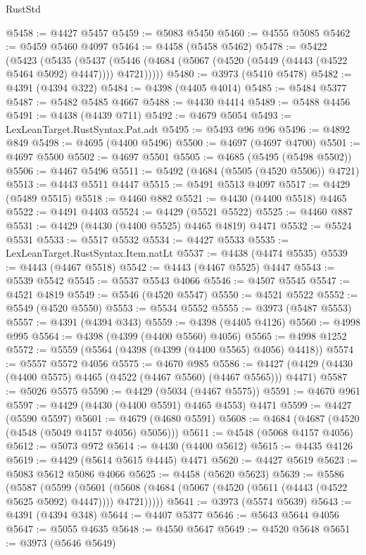 \begin{lexlean}{RustStd}
\begin{coremodule}
@5458 := @4427 @5457
@5459 := @5083 @5450
@5460 := @4555 @5085
@5462 := @5459 @5460 @4097
@5464 := @4458 (@5458 @5462)
@5478 := @5422
    (@5423
      (@5435
        (@5437 (@5446 (@4684 (@5067 (@4520 (@5449 (@4443 (@4522 @5464 @5092) @4447)))) @4721)))))
@5480 := @3973 (@5410 @5478)
@5482 := @4391 (@4394 @322)
@5484 := @4398 (@4405 @4014)
@5485 := @5484 @5377
@5487 := @5482 @5485 @4667
@5488 := @4430 @4414
@5489 := @5488 @4456
@5491 := @4438 (@4439 @711)
@5492 := @4679 @5054
@5493 := LexLeanTarget.RustSyntax.Pat.adt
@5495 := @5493 @96 @96
@5496 := @4892 @849
@5498 := @4695 (@4400 @5496)
@5500 := @4697 (@4697 @4700)
@5501 := @4697 @5500
@5502 := @4697 @5501
@5505 := @4685 (@5495 (@5498 @5502))
@5506 := @4467 @5496
@5511 := @5492 (@4684 (@5505 (@4520 @5506)) @4721)
@5513 := @4443 @5511 @4447
@5515 := @5491 @5513 @4097
@5517 := @4429 (@5489 @5515)
@5518 := @4460 @882
@5521 := @4430 (@4400 @5518) @4465
@5522 := @4491 @4403
@5524 := @4429 (@5521 @5522)
@5525 := @4460 @887
@5531 := @4429 (@4430 (@4400 @5525) @4465 @4819) @4471
@5532 := @5524 @5531
@5533 := @5517 @5532
@5534 := @4427 @5533
@5535 := LexLeanTarget.RustSyntax.Item.natLt
@5537 := @4438 (@4474 @5535)
@5539 := @4443 (@4467 @5518)
@5542 := @4443 (@4467 @5525) @4447
@5543 := @5539 @5542
@5545 := @5537 @5543 @4066
@5546 := @4507 @5545
@5547 := @4521 @4819
@5549 := @5546 (@4520 @5547)
@5550 := @4521 @5522
@5552 := @5549 (@4520 @5550)
@5553 := @5534 @5552
@5555 := @3973 (@5487 @5553)
@5557 := @4391 (@4394 @343)
@5559 := @4398 (@4405 @4126)
@5560 := @4998 @995
@5564 := @4398 (@4399 (@4400 @5560) @4056)
@5565 := @4998 @1252
@5572 := @5559 (@5564 (@4398 (@4399 (@4400 @5565) @4056) @4418))
@5574 := @5557 @5572 @4056
@5575 := @4670 @985
@5586 := @4427 (@4429 (@4430 (@4400 @5575) @4465 (@4522 (@4467 @5560) (@4467 @5565))) @4471)
@5587 := @5026 @5575
@5590 := @4429 (@5034 (@4467 @5575))
@5591 := @4670 @961
@5597 := @4429 (@4430 (@4400 @5591) @4465 @4553) @4471
@5599 := @4427 (@5590 @5597)
@5601 := @4679 (@4680 @5591)
@5608 := @4684 (@4687 (@4520 (@4548 (@5049 @4157 @4056) @5056)))
@5611 := @4548 (@5068 @4157 @4056)
@5612 := @5073 @972
@5614 := @4430 (@4400 @5612)
@5615 := @4435 @4126
@5619 := @4429 (@5614 @5615 @4445) @4471
@5620 := @4427 @5619
@5623 := @5083 @5612 @5086 @4066
@5625 := @4458 (@5620 @5623)
@5639 := @5586
    (@5587
      (@5599
        (@5601 (@5608 (@4684 (@5067 (@4520 (@5611 (@4443 (@4522 @5625 @5092) @4447)))) @4721)))))
@5641 := @3973 (@5574 @5639)
@5643 := @4391 (@4394 @348)
@5644 := @4407 @5377
@5646 := @5643 @5644 @4056
@5647 := @5055 @4635
@5648 := @4550 @5647
@5649 := @4520 @5648
@5651 := @3973 (@5646 @5649)

\end{coremodule}
\end{lexlean}
